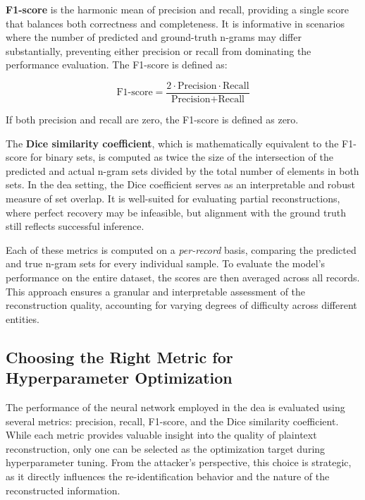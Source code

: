 \textbf{F1-score} is the harmonic mean of precision and recall, providing a single score that balances both correctness and completeness.
It is informative in scenarios where the number of predicted and ground-truth n-grams may differ substantially, preventing either precision or recall from dominating the performance evaluation.
The F1-score is defined as:

\[
\text{F1-score} = \frac{2 \cdot \text{Precision} \cdot \text{Recall}}{\text{Precision} + \text{Recall}}
\]

If both precision and recall are zero, the F1-score is defined as zero.

The \textbf{Dice similarity coefficient}, which is mathematically equivalent to the F1-score for binary sets, is computed as twice the size of the intersection of the predicted and actual n-gram sets divided by the total number of elements in both sets.
In the \ac{dea} setting, the Dice coefficient serves as an interpretable and robust measure of set overlap.
It is well-suited for evaluating partial reconstructions, where perfect recovery may be infeasible, but  alignment with the ground truth still reflects successful inference.

Each of these metrics is computed on a \emph{per-record} basis, comparing the predicted and true n-gram sets for every individual sample.
To evaluate the model's performance on the entire dataset, the scores are then averaged across all records.
This approach ensures a granular and interpretable assessment of the reconstruction quality, accounting for varying degrees of difficulty across different entities.

\subsection{Choosing the Right Metric for Hyperparameter Optimization} \label{sec:choosingmetric}


The performance of the neural network employed in the \ac{dea} is evaluated using several metrics: precision, recall, F1-score, and the Dice similarity coefficient.
While each metric provides valuable insight into the quality of plaintext reconstruction, only one can be selected as the optimization target during hyperparameter tuning.
From the attacker's perspective, this choice is strategic, as it directly influences the re-identification behavior and the nature of the reconstructed information.

